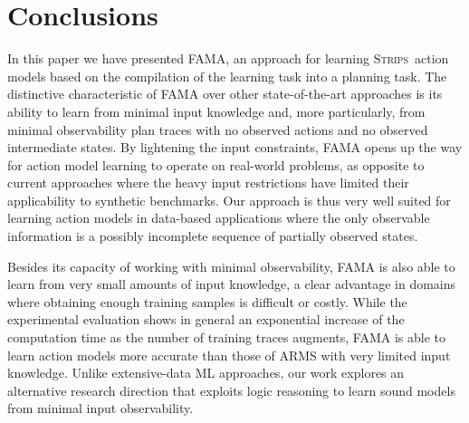 \documentclass[3p,times]{elsarticle}
\newcommand{\strips}{\textsc{Strips}}     %
\newcommand{\ARMS}{{\small {\sffamily ARMS}}\xspace}
\newcommand{\FAMA}{{\small {\sffamily FAMA}}\xspace}
\begin{document}














\section{Conclusions}
\label{sec:conclusions}


In this paper we have presented \FAMA, an approach for learning \strips\ action models based on the compilation of the learning task into a planning task. The distinctive characteristic of \FAMA over other state-of-the-art approaches is its ability to learn from minimal input knowledge and, more particularly, from minimal observability plan traces with no observed actions and no observed intermediate states. By lightening the input constraints, \FAMA opens up the way for action model learning to operate on real-world problems, as opposite to current approaches where the heavy input restrictions have limited their applicability to synthetic benchmarks. Our approach is thus very well suited for learning action models in data-based applications where the only observable information is a possibly incomplete sequence of partially observed states.

Besides its capacity of working with minimal observability, \FAMA is also able to learn from very small amounts of input knowledge, a clear advantage in domains where obtaining enough training samples is difficult or costly. While the experimental evaluation shows in general an exponential increase of the computation time as the number of training traces augments, \FAMA is able to learn action models more accurate than those of \ARMS with very limited input knowledge. Unlike extensive-data ML approaches, our work explores an alternative research direction that exploits logic reasoning to learn sound models from minimal input observability.
\end{document}
